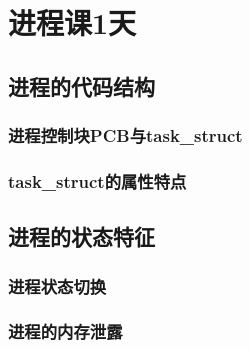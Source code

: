 

\partabstractrp{}
\partabstractlettrine{}{} %

\part{进程课1天}

\chapter{进程的代码结构}
\section{进程控制块PCB与task\_struct}
\section{task\_struct的属性特点}


\chapter{进程的状态特征}

\section{进程状态切换}
\section{进程的内存泄露}

